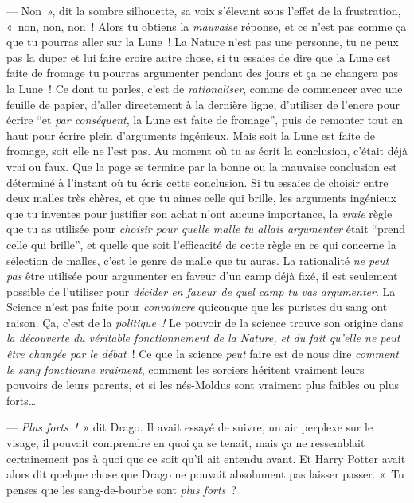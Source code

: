 --- Non~», dit la sombre silhouette, sa voix s'élevant sous l'effet de la frustration, «~non, non, non~!
Alors tu obtiens la \emph{mauvaise} réponse, et ce n'est pas comme ça que tu pourras aller sur la Lune~!
La Nature n'est pas une personne, tu ne peux pas la duper et lui faire croire autre chose, si tu essaies de dire que la Lune est faite de fromage tu pourras argumenter pendant des jours et ça ne changera pas la Lune~!
Ce dont tu parles, c'est de \emph{rationaliser}, comme de commencer avec une feuille de papier, d'aller directement à la dernière ligne, d'utiliser de l'encre pour écrire “et \emph{par conséquent}, la Lune est faite de fromage”, puis de remonter tout en haut pour écrire plein d'arguments ingénieux.
Mais soit la Lune est faite de fromage, soit elle ne l'est pas.
Au moment où tu as écrit la conclusion, c'était déjà vrai ou faux.
Que la page se termine par la bonne ou la mauvaise conclusion est déterminé à l'instant où tu écris cette conclusion.
Si tu essaies de choisir entre deux malles très chères, et que tu aimes celle qui brille, les arguments ingénieux que tu inventes pour justifier son achat n'ont aucune importance, la \emph{vraie} règle que tu as utilisée pour \emph{choisir pour quelle malle tu allais argumenter} était “prend celle qui brille”, et quelle que soit l'efficacité de cette règle en ce qui concerne la sélection de malles, c'est le genre de malle que tu auras.
La rationalité \emph{ne peut pas} être utilisée pour argumenter en faveur d'un camp déjà fixé, il est seulement possible de l'utiliser pour \emph{décider en faveur de quel camp tu vas argumenter}.
La Science n'est pas faite pour \emph{convaincre} quiconque que les puristes du sang ont raison.
Ça, c'est de la \emph{politique~!} Le pouvoir de la science trouve son origine dans \emph{la découverte du véritable fonctionnement de la Nature, et du fait qu'elle ne peut être changée par le débat}~!
Ce que la science \emph{peut} faire est de nous dire \emph{comment le sang fonctionne vraiment}, comment les sorciers héritent vraiment leurs pouvoirs de leurs parents, et si les nés-Moldus sont vraiment plus faibles ou plus forts…

--- \emph{Plus forts~!}~» dit Drago.
Il avait essayé de suivre, un air perplexe sur le visage, il pouvait comprendre en quoi ça se tenait, mais ça ne ressemblait certainement pas à quoi que ce soit qu'il ait entendu avant.
Et Harry Potter avait alors dit quelque chose que Drago ne pouvait absolument pas laisser passer.
«~Tu penses que les sang-de-bourbe sont \emph{plus forts}~?

